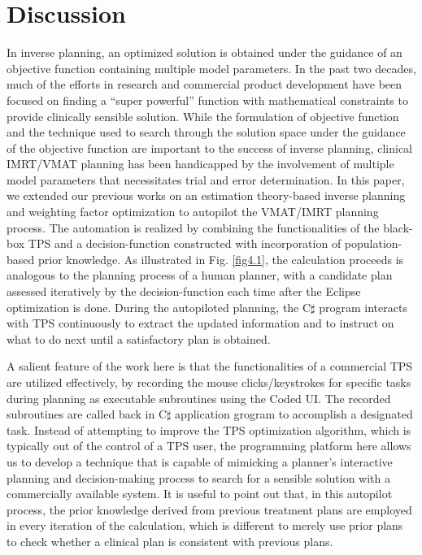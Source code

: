 \section{Discussion}
In inverse planning, an optimized solution is obtained under the guidance of an objective function containing multiple model parameters\cite{amit2015,chan2006,good2013,kim2015,li2000,wu2013,xing1999a, zhang2014}. In the past two decades, much of the efforts in research and commercial product development have been focused on finding a ``super powerful'' function with mathematical constraints to provide clinically sensible solution. While the formulation of objective function and the technique used to search through the solution space under the guidance of the objective function are important to the success of inverse planning, clinical IMRT/VMAT planning has been handicapped by the involvement of multiple model parameters that necessitates trial and error determination. In this paper, we extended our previous works on an estimation theory-based inverse planning and weighting factor optimization to autopilot the VMAT/IMRT planning process. The automation is realized by combining the functionalities of the black-box TPS and a decision-function constructed with incorporation of population-based prior knowledge. As illustrated in Fig. \ref{fig4.1}, the calculation proceeds is analogous to the planning process of a human planner, with a candidate plan assessed iteratively by the decision-function each time after the Eclipse optimization is done\cite{good2013,xing1999a}. During the autopiloted planning, the C$\sharp$ program interacts with TPS continuously to extract the updated information and to instruct on what to do next until a satisfactory plan is obtained. 

A salient feature of the work here is that the functionalities of a commercial TPS are utilized effectively, by recording the mouse clicks/keystrokes for specific tasks during planning as executable subroutines using the Coded UI. The recorded subroutines are called back in C$\sharp$ application grogram to accomplish a designated task. Instead of attempting to improve the TPS optimization algorithm, which is typically out of the control of a TPS user, the programming platform here allows us to develop a technique that is capable of mimicking a planner's interactive planning and decision-making process to search for a sensible solution with a commercially available system. It is useful to point out that, in this autopilot process, the prior knowledge derived from previous treatment plans are employed in every iteration of the calculation, which is different to merely use prior plans to check whether a clinical plan is consistent with previous plans\cite{li2015,moore2015,schreibmann2014}. 

